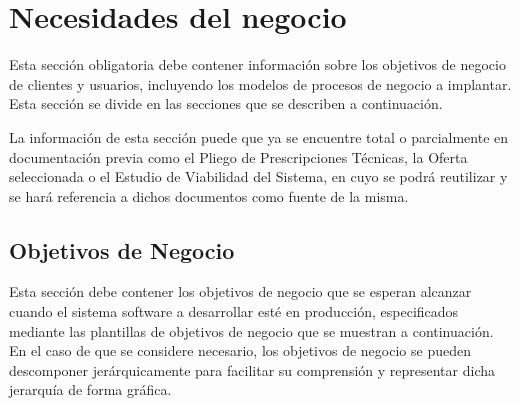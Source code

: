 \section{Necesidades del negocio}

\begin{textoazul}
Esta sección obligatoria debe contener información sobre los objetivos de negocio de clientes y usuarios, incluyendo los modelos de procesos de negocio a implantar. Esta sección se divide en las secciones que se describen a continuación.

La información de esta sección puede que ya se encuentre total o parcialmente en documentación previa como el Pliego de Prescripciones Técnicas, la Oferta seleccionada o el Estudio de Viabilidad del Sistema, en cuyo se podrá reutilizar y se hará referencia a dichos documentos como fuente de la misma.
\end{textoazul}
 
\subsection{Objetivos de Negocio}
\begin{textoazul}
Esta sección debe contener los objetivos de negocio que se esperan alcanzar cuando el sistema software a desarrollar esté en producción, especificados mediante las  plantillas de objetivos de negocio que se muestran a continuación. En el caso de que se considere necesario, los objetivos de negocio se pueden descomponer jerárquicamente para facilitar su comprensión y representar dicha jerarquía de forma gráfica.
 \end{textoazul}




